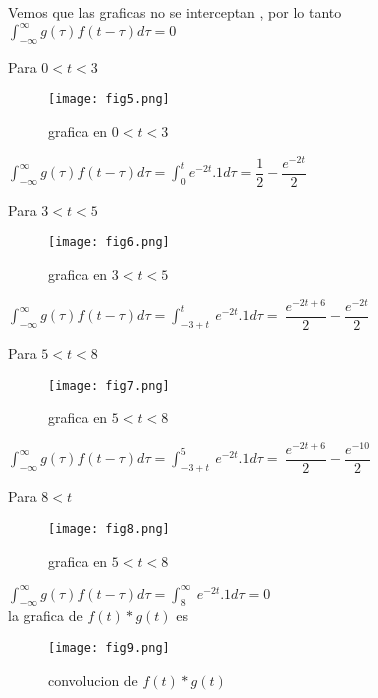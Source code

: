 \documentclass[12pt]{article}
\begin{document}
Vemos que las graficas no se interceptan , por lo tanto $\int_{-\infty}^{\infty} g(\tau)f(t-\tau) d\tau = 0 $\newline


Para   $0 < t < 3$ \\
\begin{figure}[H]
    \centering
    \texttt{[image: fig5.png]}
    \caption{grafica en $0 < t < 3$ }
\end{figure}
$\int_{-\infty}^{\infty} g(\tau)f(t-\tau) d\tau = \int_{0}^{t} e^{-2t}.1 d\tau = \dfrac{1}{2}-\dfrac{e^{-2t}}{2}  $\\
\newpage


Para   $3 < t < 5$ \\
\begin{figure}[H]
    \centering
    \texttt{[image: fig6.png]}
    \caption{grafica en $3 < t < 5$ }
\end{figure}
$\int_{-\infty}^{\infty} g(\tau)f(t-\tau) d\tau = \int_{-3+t}^{t} \ e^{-2t}.1 d\tau = \ \dfrac{e^{-2t+6}}{2}-\dfrac{e^{-2t}}{2}  $\\
\newline
\newline


Para   $5 < t < 8$ \\
\begin{figure}[H]
    \centering
    \texttt{[image: fig7.png]}
    \caption{grafica en $5 < t < 8$ }
\end{figure}
$\int_{-\infty}^{\infty} g(\tau)f(t-\tau) d\tau = \int_{-3+t}^{5} \ e^{-2t}.1 d\tau = \ \dfrac{e^{-2t+6}}{2}-\dfrac{e^{-10}}{2}  $\\
\newpage



Para   $8 < t$ \\
\begin{figure}[H]
    \centering
    \texttt{[image: fig8.png]}
    \caption{grafica en $5 < t < 8$ }
\end{figure}

$\int_{-\infty}^{\infty} g(\tau)f(t-\tau) d\tau = \int_{8}^{\infty} \ e^{-2t}.1 d\tau = 0  $\\ \newline
la grafica de $f(t)*g(t)$ es

\begin{figure}[H]
    \centering
    \texttt{[image: fig9.png]}
    \caption{convolucion de $f(t)*g(t)$ }
\end{figure}
\newpage
\end{document}
